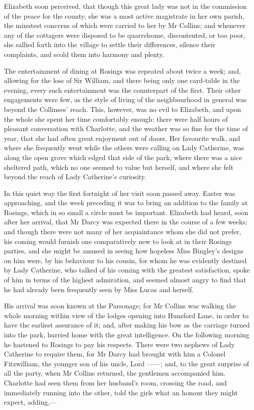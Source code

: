 Elizabeth soon perceived, that though this great lady was not in the commission of the peace for the county, she was a most active magistrate in her own parish, the minutest concerns of which were carried to her by Mr Collins; and whenever any of the cottagers were disposed to be quarrelsome, discontented, or too poor, she sallied forth into the village to settle their differences, silence their complaints, and scold them into harmony and plenty.

The entertainment of dining at Rosings was repeated about twice a week; and, allowing for the loss of Sir William, and there being only one card-table in the evening, every such entertainment was the counterpart of the first. Their other engagements were few, as the style of living of the neighbourhood in general was beyond the Collinses' reach. This, however, was no evil to Elizabeth, and upon the whole she spent her time comfortably enough: there were half hours of pleasant conversation with Charlotte, and the weather was so fine for the time of year, that she had often great enjoyment out of doors. Her favourite walk, and where she frequently went while the others were calling on Lady Catherine, was along the open grove which edged that side of the park, where there was a nice sheltered path, which no one seemed to value but herself, and where she felt beyond the reach of Lady Catherine's curiosity.

In this quiet way the first fortnight of her visit soon passed away. Easter was approaching, and the week preceding it was to bring an addition to the family at Rosings, which in so small a circle must be important. Elizabeth had heard, soon after her arrival, that Mr Darcy was expected there in the course of a few weeks; and though there were not many of her acquaintance whom she did not prefer, his coming would furnish one comparatively new to look at in their Rosings parties, and she might be amused in seeing how hopeless Miss Bingley's designs on him were, by his behaviour to his cousin, for whom he was evidently destined by Lady Catherine, who talked of his coming with the greatest satisfaction, spoke of him in terms of the highest admiration, and seemed almost angry to find that he had already been frequently seen by Miss Lucas and herself.

His arrival was soon known at the Parsonage; for Mr Collins was walking the whole morning within view of the lodges opening into Hunsford Lane, in order to have the earliest assurance of it; and, after making his bow as the carriage turned into the park, hurried home with the great intelligence. On the following morning he hastened to Rosings to pay his respects. There were two nephews of Lady Catherine to require them, for Mr Darcy had brought with him a Colonel Fitzwilliam, the younger son of his uncle, Lord ——; and, to the great surprise of all the party, when Mr Collins returned, the gentlemen accompanied him. Charlotte had seen them from her husband's room, crossing the road, and immediately running into the other, told the girls what an honour they might expect, adding,—

